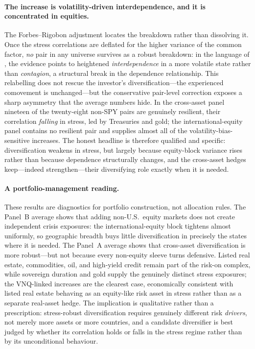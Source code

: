 \paragraph{The increase is volatility-driven interdependence, and it is concentrated in equities.} The Forbes--Rigobon adjustment locates the breakdown rather than dissolving it. Once the stress correlations are deflated for the higher variance of the common factor, \emph{no} pair in any universe survives as a robust breakdown: in the language of \citet{forbesrigobon2002}, the evidence points to heightened \emph{interdependence} in a more volatile state rather than \emph{contagion}, a structural break in the dependence relationship. This relabelling does not rescue the investor's diversification---the experienced comovement is unchanged---but the conservative pair-level correction exposes a sharp asymmetry that the average numbers hide. In the cross-asset panel nineteen of the twenty-eight non-SPY pairs are genuinely resilient, their correlation \emph{falling} in stress, led by Treasuries and gold; the international-equity panel contains no resilient pair and supplies almost all of the volatility-bias-sensitive increases. The honest headline is therefore qualified and specific: diversification weakens in stress, but largely because equity-block variance rises rather than because dependence structurally changes, and the cross-asset hedges keep---indeed strengthen---their diversifying role exactly when it is needed.

\paragraph{A portfolio-management reading.} These results are diagnostics for portfolio construction, not allocation rules. The Panel~B average shows that adding non-U.S.\ equity markets does not create independent crisis exposures: the international-equity block tightens almost uniformly, so geographic breadth buys little diversification in precisely the states where it is needed. The Panel~A average shows that cross-asset diversification is more robust---but not because every non-equity sleeve turns defensive. Listed real estate, commodities, oil, and high-yield credit remain part of the risk-on complex, while sovereign duration and gold supply the genuinely distinct stress exposures; the VNQ-linked increases are the clearest case, economically consistent with listed real estate behaving as an equity-like risk asset in stress rather than as a separate real-asset hedge. The implication is qualitative rather than a prescription: stress-robust diversification requires genuinely different risk \emph{drivers}, not merely more assets or more countries, and a candidate diversifier is best judged by whether its correlation holds or falls in the stress regime rather than by its unconditional behaviour.

